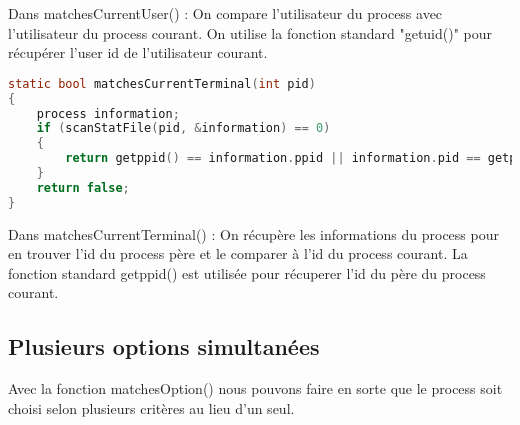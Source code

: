 Dans matchesCurrentUser() : On compare l'utilisateur du process avec l'utilisateur du process courant. On utilise la fonction standard "getuid()" pour récupérer l'user id de l'utilisateur courant.


\begin{lstlisting}[frame=single, language=c]
static bool matchesCurrentTerminal(int pid)
{
    process information;
    if (scanStatFile(pid, &information) == 0)
    {
        return getppid() == information.ppid || information.pid == getppid();
    }
    return false;
}
\end{lstlisting}

Dans matchesCurrentTerminal() : On récupère les informations du process pour en trouver l'id du process père et le comparer à l'id du process courant. La fonction standard getppid() est utilisée pour récuperer l'id du père du process courant.

\subsection{Plusieurs options simultanées} 

Avec la fonction matchesOption() nous pouvons faire en sorte que le process soit choisi selon plusieurs critères au lieu d'un seul.